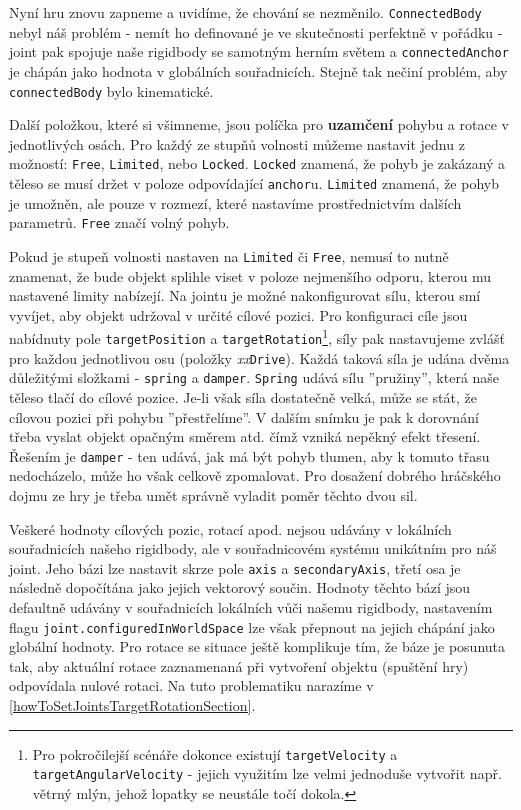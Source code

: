 Nyní hru znovu zapneme a uvidíme, že chování se nezměnilo. \texttt{ConnectedBody} nebyl náš problém - nemít ho definované je ve skutečnosti perfektně v pořádku - joint pak spojuje naše rigidbody se samotným herním světem a \texttt{connectedAnchor} je chápán jako hodnota v globálních souřadnicích. Stejně tak nečiní problém, aby \texttt{connectedBody} bylo kinematické.

Další položkou, které si všimneme, jsou políčka pro \textbf{uzamčení} pohybu a rotace v jednotlivých osách. Pro každý ze stupňů volnosti můžeme nastavit jednu z možností: \texttt{Free}, \texttt{Limited}, nebo \texttt{Locked}. \texttt{Locked} znamená, že pohyb je zakázaný a těleso se musí držet v poloze odpovídající \texttt{anchor}u. \texttt{Limited} znamená, že pohyb je umožněn, ale pouze v rozmezí, které nastavíme prostřednictvím dalších parametrů. \texttt{Free} značí volný pohyb.

Pokud je stupeň volnosti nastaven na \texttt{Limited} či \texttt{Free}, nemusí to nutně znamenat, že bude objekt splihle viset v poloze nejmenšího odporu, kterou mu nastavené limity nabízejí. Na jointu je možné nakonfigurovat sílu, kterou smí vyvíjet, aby objekt udržoval v určité cílové pozici. Pro konfiguraci cíle jsou nabídnuty pole \texttt{targetPosition} a \texttt{targetRotation}\footnote{Pro pokročilejší scénáře dokonce existují \texttt{targetVelocity} a \texttt{targetAngularVelocity} - jejich využitím lze velmi jednoduše vytvořit např. větrný mlýn, jehož lopatky se neustále točí dokola.}, síly pak nastavujeme zvlášť pro každou jednotlivou osu (položky \textit{xx}\texttt{Drive}). Každá taková síla je udána dvěma důležitými složkami - \texttt{spring} a \texttt{damper}. \texttt{Spring} udává sílu ''pružiny'', která naše těleso tlačí do cílové pozice. Je-li však síla dostatečně velká, může se stát, že cílovou pozici při pohybu ''přestřelíme''. V dalším snímku je pak k dorovnání třeba vyslat objekt opačným směrem atd. čímž vzniká nepěkný efekt třesení. Řešením je \texttt{damper} - ten udává, jak má být pohyb tlumen, aby k tomuto třasu nedocházelo, může ho však celkově zpomalovat. Pro dosažení dobrého hráčského dojmu ze hry je třeba umět správně vyladit poměr těchto dvou sil.

Veškeré hodnoty cílových pozic, rotací apod. nejsou udávány v lokálních souřadnicích našeho rigidbody, ale v souřadnicovém systému unikátním pro náš joint. Jeho bázi lze nastavit skrze pole \texttt{axis} a \texttt{secondaryAxis}, třetí osa je následně dopočítána jako jejich vektorový součin. Hodnoty těchto bází jsou defaultně udávány v souřadnicích lokálních vůči našemu rigidbody, nastavením flagu \texttt{joint.configuredInWorldSpace} lze však přepnout na jejich chápání jako globální hodnoty. Pro rotace se situace ještě komplikuje tím, že báze je posunuta tak, aby aktuální rotace zaznamenaná při vytvoření objektu (spuštění hry) odpovídala nulové rotaci. Na tuto problematiku narazíme v \ref{howToSetJointsTargetRotationSection}.

